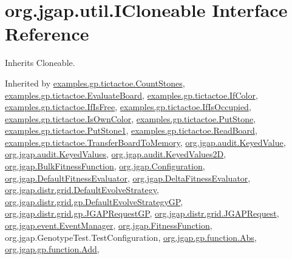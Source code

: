 \hypertarget{interfaceorg_1_1jgap_1_1util_1_1_i_cloneable}{\section{org.\-jgap.\-util.\-I\-Cloneable Interface Reference}
\label{interfaceorg_1_1jgap_1_1util_1_1_i_cloneable}
}


Inherits Cloneable.



Inherited by \hyperlink{classexamples_1_1gp_1_1tictactoe_1_1_count_stones}{examples.\-gp.\-tictactoe.\-Count\-Stones}, \hyperlink{classexamples_1_1gp_1_1tictactoe_1_1_evaluate_board}{examples.\-gp.\-tictactoe.\-Evaluate\-Board}, \hyperlink{classexamples_1_1gp_1_1tictactoe_1_1_if_color}{examples.\-gp.\-tictactoe.\-If\-Color}, \hyperlink{classexamples_1_1gp_1_1tictactoe_1_1_if_is_free}{examples.\-gp.\-tictactoe.\-If\-Is\-Free}, \hyperlink{classexamples_1_1gp_1_1tictactoe_1_1_if_is_occupied}{examples.\-gp.\-tictactoe.\-If\-Is\-Occupied}, \hyperlink{classexamples_1_1gp_1_1tictactoe_1_1_is_own_color}{examples.\-gp.\-tictactoe.\-Is\-Own\-Color}, \hyperlink{classexamples_1_1gp_1_1tictactoe_1_1_put_stone}{examples.\-gp.\-tictactoe.\-Put\-Stone}, \hyperlink{classexamples_1_1gp_1_1tictactoe_1_1_put_stone1}{examples.\-gp.\-tictactoe.\-Put\-Stone1}, \hyperlink{classexamples_1_1gp_1_1tictactoe_1_1_read_board}{examples.\-gp.\-tictactoe.\-Read\-Board}, \hyperlink{classexamples_1_1gp_1_1tictactoe_1_1_transfer_board_to_memory}{examples.\-gp.\-tictactoe.\-Transfer\-Board\-To\-Memory}, \hyperlink{classorg_1_1jgap_1_1audit_1_1_keyed_value}{org.\-jgap.\-audit.\-Keyed\-Value}, \hyperlink{classorg_1_1jgap_1_1audit_1_1_keyed_values}{org.\-jgap.\-audit.\-Keyed\-Values}, \hyperlink{classorg_1_1jgap_1_1audit_1_1_keyed_values2_d}{org.\-jgap.\-audit.\-Keyed\-Values2\-D}, \hyperlink{classorg_1_1jgap_1_1_bulk_fitness_function}{org.\-jgap.\-Bulk\-Fitness\-Function}, \hyperlink{classorg_1_1jgap_1_1_configuration}{org.\-jgap.\-Configuration}, \hyperlink{classorg_1_1jgap_1_1_default_fitness_evaluator}{org.\-jgap.\-Default\-Fitness\-Evaluator}, \hyperlink{classorg_1_1jgap_1_1_delta_fitness_evaluator}{org.\-jgap.\-Delta\-Fitness\-Evaluator}, \hyperlink{classorg_1_1jgap_1_1distr_1_1grid_1_1_default_evolve_strategy}{org.\-jgap.\-distr.\-grid.\-Default\-Evolve\-Strategy}, \hyperlink{classorg_1_1jgap_1_1distr_1_1grid_1_1gp_1_1_default_evolve_strategy_g_p}{org.\-jgap.\-distr.\-grid.\-gp.\-Default\-Evolve\-Strategy\-G\-P}, \hyperlink{classorg_1_1jgap_1_1distr_1_1grid_1_1gp_1_1_j_g_a_p_request_g_p}{org.\-jgap.\-distr.\-grid.\-gp.\-J\-G\-A\-P\-Request\-G\-P}, \hyperlink{classorg_1_1jgap_1_1distr_1_1grid_1_1_j_g_a_p_request}{org.\-jgap.\-distr.\-grid.\-J\-G\-A\-P\-Request}, \hyperlink{classorg_1_1jgap_1_1event_1_1_event_manager}{org.\-jgap.\-event.\-Event\-Manager}, \hyperlink{classorg_1_1jgap_1_1_fitness_function}{org.\-jgap.\-Fitness\-Function}, org.\-jgap.\-Genotype\-Test.\-Test\-Configuration, \hyperlink{classorg_1_1jgap_1_1gp_1_1function_1_1_abs}{org.\-jgap.\-gp.\-function.\-Abs}, \hyperlink{classorg_1_1jgap_1_1gp_1_1function_1_1_add}{org.\-jgap.\-gp.\-function.\-Add}, 